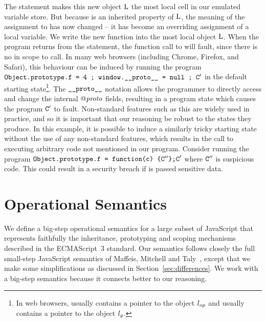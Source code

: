 \documentclass{article}
\begin{document}
The  statement makes this new object ${\mathrm{L}}$ the most local
cell in our emulated variable store. But because  is an
inherited property of ${\mathrm{L}}$, the meaning of the assignment to 
has now changed -- it has become an overriding assignment of a local
variable. We write the new function  into the most local object
${\mathrm{L}}$. When the program returns from the  statement, the
function call to  will fault, since there is no  in
scope to call. In many web browsers (including Chrome, Firefox, and
Safari), this behaviour can be induced by running the program
$\mbox{\texttt{{\upshape Object.prototype.f = 4 ; window.\_\_proto\_\_ = null ; C}}}'$ in
the default starting state\footnote{In web browsers,
   usually contains a pointer to the object
  $l_{op}$ and  usually contains a pointer to the object
  $l_g$.}. The $\mbox{\texttt{{\upshape \_\_proto\_\_}}}$ notation allows the programmer to
directly access and change the internal $\mathit{@proto}$ fields, resulting in
a program state which causes the program $\mbox{\texttt{{\upshape C}}}'$ to fault.
Non-standard features such as this are widely used in practice, and so
it is important that our reasoning be robust to the states they
produce. In this example, it is possible to induce a similarly tricky
starting state without the use of any non-standard features, which
results in the call to  executing arbitrary code not mentioned
in our program. Consider running the program $\mbox{\texttt{{\upshape Object.prototype.f =
  function(c) \{}}}\mbox{\texttt{{\upshape C}}}''\mbox{\texttt{{\upshape \};C}}}'$ where $\mbox{\texttt{{\upshape C}}}''$ is suspicious
code. This could result in a security breach if  is passed
sensitive data.


\section{Operational Semantics}\label{sec:JLB}



%
%
%




We define a big-step operational semantics for a large subset of
JavaScript that represents faithfully the inheritance, prototyping and
scoping mechanisms described in the ECMAScript~3 standard. Our
semantics follows closely  the full small-step JavaScript semantics of
Maffeis, Mitchell and Taly~\cite{MMT-APLAS-TR08}, except that we  make some
simplifications as discussed in Section~\ref{sec:differences}. We work with a big-step semantics because it connects better to our reasoning. 
\end{document}
